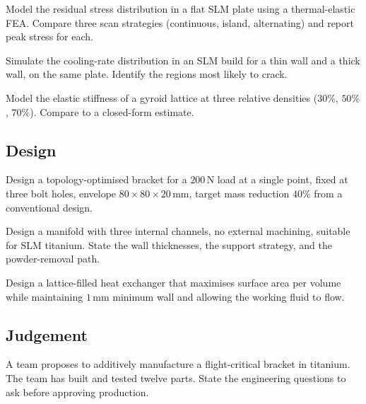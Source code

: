 \begin{exercise}
Model the residual stress distribution in a flat SLM plate using a thermal-elastic FEA. Compare three scan strategies (continuous, island, alternating) and report peak stress for each.
\end{exercise}

\begin{exercise}
Simulate the cooling-rate distribution in an SLM build for a thin wall and a thick wall, on the same plate. Identify the regions most likely to crack.
\end{exercise}

\begin{exercise}
Model the elastic stiffness of a gyroid lattice at three relative densities ($30\%$, $50\%$, $70\%$). Compare to a closed-form estimate.
\end{exercise}

\subsection*{Design}

\begin{exercise}
Design a topology-optimised bracket for a $200\,\text{N}$ load at a single point, fixed at three bolt holes, envelope $80 \times 80 \times 20\,\text{mm}$, target mass reduction $40\%$ from a conventional design.
\end{exercise}

\begin{exercise}
Design a manifold with three internal channels, no external machining, suitable for SLM titanium. State the wall thicknesses, the support strategy, and the powder-removal path.
\end{exercise}

\begin{exercise}
Design a lattice-filled heat exchanger that maximises surface area per volume while maintaining $1\,\text{mm}$ minimum wall and allowing the working fluid to flow.
\end{exercise}

\subsection*{Judgement}

\begin{exercise}
A team proposes to additively manufacture a flight-critical bracket in titanium. The team has built and tested twelve parts. State the engineering questions to ask before approving production.
\end{exercise}

